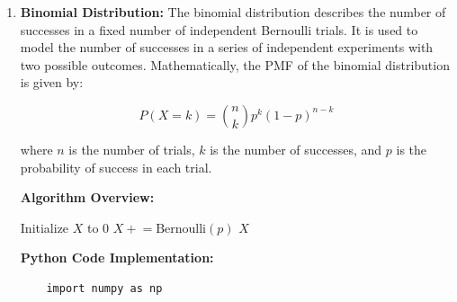 \documentclass[12pt]{book} %
\begin{document}
\begin{enumerate}
    \[
    P(X=x) = \begin{cases} 
      p & \text{if } x = 1 \\
      1-p & \text{if } x = 0
   \end{cases}
    \]
    
    where \(p\) is the probability of success.
\textbf{Algorithm Overview:}
    \FloatBarrier
\begin{algorithm}
\caption{Generating Random Numbers from a Bernoulli Distribution}
\begin{algorithmic}[1]
    \State Generate a random number \(U\) from the uniform distribution on the interval \([0, 1]\)
        \State {}
    \Else
        \State {}
    \EndIf
\EndProcedure
\end{algorithmic}
\end{algorithm}
\FloatBarrier
\textbf{Python Code Implementation:}
\FloatBarrier
\begin{lstlisting}
    import random

def Bernoulli(p):
    # Generate a random number U from the uniform distribution on the interval [0, 1]
    U = random.random()
    # Check if U is less than p
    if U < p:
        return 1
    else:
        return 0

# Example usage:
p = 0.5  # Probability of success
result = Bernoulli(p)
print("Random number generated from Bernoulli distribution:", result)
\end{lstlisting}
    
    \item \textbf{Binomial Distribution:} The binomial distribution describes the number of successes in a fixed number of independent Bernoulli trials. It is used to model the number of successes in a series of independent experiments with two possible outcomes. Mathematically, the PMF of the binomial distribution is given by:
    
    \[
    P(X=k) = \binom{n}{k} p^k (1-p)^{n-k}
    \]
    
    where \(n\) is the number of trials, \(k\) is the number of successes, and \(p\) is the probability of success in each trial.

\textbf{Algorithm Overview:}
    \FloatBarrier
\begin{algorithm}
\caption{Generating Random Numbers from a Binomial Distribution}
\begin{algorithmic}[1]
    \State Initialize \(X\) to 0
        \State \(X \mathrel{+}= \text{Bernoulli}(p)\)
    \EndFor
    \State \Return \(X\)
\EndProcedure
\end{algorithmic}
\end{algorithm}
\FloatBarrier
\textbf{Python Code Implementation:}
\FloatBarrier
\begin{lstlisting}
    import numpy as np


\end{lstlisting}
\end{enumerate}
\end{document}
